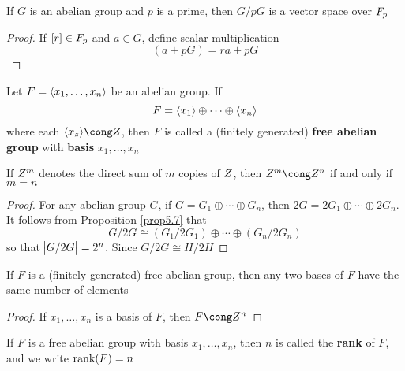 \documentclass[11pt]{article}
\begin{document}
\begin{proposition}[]
If \(G\) is an abelian group and \(p\) is a prime, then \(G/pG\) is a vector
space over \(\relax{F}_p\)
\end{proposition}

\begin{proof}
If \([r]\in\relax{F}_p\) and \(a\in G\), define scalar multiplication
\begin{equation*}
[r](a+pG)=ra+pG
\end{equation*}
\end{proof}

\begin{definition}[]
Let \(F=\langle x_1,\dots,x_n\rangle\) be an abelian group. If 
\begin{equation*}
F=\langle x_1\rangle\oplus\cdots\oplus\langle x_n\rangle
\end{equation*}
where each \(\la x_z\ra\cong\Z\), then \(F\) is called a (finitely generated) 
\textbf{free abelian group} with \textbf{basis} \(x_1,\dots,x_n\)
\end{definition}

\begin{proposition}[]
If \(\relax{Z}^m\) denotes the direct sum of \(m\) copies of \(\relax{Z}\), then
\(\Z^m\cong\Z^n\) if and only if \(m=n\)
\end{proposition}

\begin{proof}
For any abelian group \(G\), if \(G=G_1\oplus\cdots\oplus G_n\), then
\(2G=2G_1\oplus\cdots\oplus 2G_n\). It follows from Proposition \ref{prop5.7}
that
\begin{equation*}
G/2G\cong(G_1/2G_1)\oplus\cdots\oplus(G_n/2G_n)
\end{equation*}
so that \(\abs{G/2G}=2^n\). Since \(G/2G\cong H/2H\)
\end{proof}

\begin{corollary}[]
If \(F\) is a (finitely generated) free abelian group, then any two bases of
\(F\) have the same number of elements
\end{corollary}

\begin{proof}
If \(x_1,\dots,x_n\) is a basis of \(F\), then \(F\cong\Z^n\)
\end{proof}

\begin{definition}[]
If \(F\) is a free abelian group with basis \(x_1,\dots,x_n\), then \(n\) is
called the \textbf{rank} of \(F\), and we write \(\text{rank}(F)=n\)
\end{definition}
\end{document}
